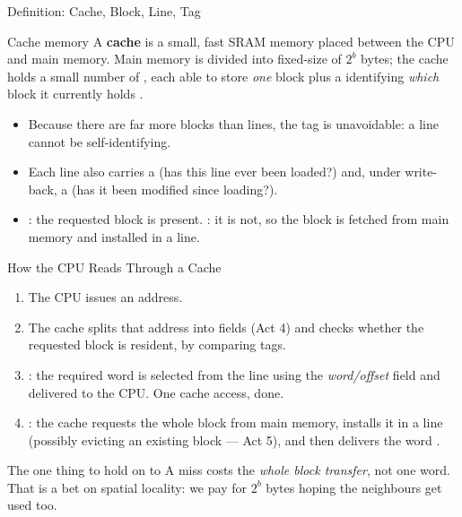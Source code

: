 \documentclass[aspectratio=169]{beamer}
\begin{document}
\begin{frame}{Definition: Cache, Block, Line, Tag}
  \begin{block}{Cache memory}
    A \textbf{cache} is a small, fast SRAM memory placed between the CPU and
    main memory. Main memory is divided into fixed-size  of $2^b$
    bytes; the cache holds a small number of , each able to store
    \emph{one} block plus a  identifying \emph{which} block it
    currently holds
    \cite[\S5.1, printed pp.~139--142]{Stallings2015_computer_organization}.
  \end{block}
  \begin{itemize}
    \item Because there are far more blocks than lines, the tag is
      unavoidable: a line cannot be self-identifying.
    \item Each line also carries a  (has this line ever been
      loaded?) and, under write-back, a  (has it been modified
      since loading?).
    \item {}: the requested block is present. : it is not,
      so the block is fetched from main memory and installed in a line.
  \end{itemize}
\end{frame}

\begin{frame}{How the CPU Reads Through a Cache}
  \begin{enumerate}
    \item The CPU issues an address.
    \item The cache splits that address into fields (Act 4) and checks
      whether the requested block is resident, by comparing tags.
    \item {}: the required word is selected from the line using the
      \emph{word/offset} field and delivered to the CPU. One cache access,
      done.
    \item {}: the cache requests the whole block from main memory,
      installs it in a line (possibly evicting an existing block --- Act 5),
      and then delivers the word
      \cite[Fig.~5.3, PDF p.~182]{Stallings2015_computer_organization}.
  \end{enumerate}
  \vspace{0.2cm}
  \begin{alertblock}{The one thing to hold on to}
    A miss costs the \emph{whole block transfer}, not one word. That is a bet
    on spatial locality: we pay for $2^b$ bytes hoping the neighbours get used
    too.
  \end{alertblock}
\end{frame}
\end{document}
